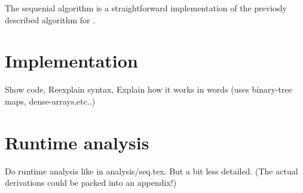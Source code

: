 


  The sequenial algorithm is a straightforward implementation of the previosly
  described algorithm for \algo.
  
  \section{Implementation}
    Show code,
    Reexplain syntax,
    Explain how it works in words (uses binary-tree maps, dense-arrays,etc..)
    
  \section{Runtime analysis}
    Do runtime analysis like in analysis/seq.tex. But a bit less detailed.
    (The actual derivations could be packed into an appendix!)
